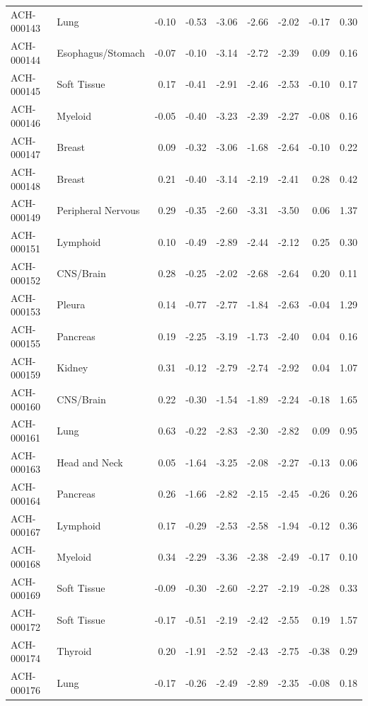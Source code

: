 \begin{footnotesize}
\begin{longtable}{llrrrrrrr}
ACH-000143 & Lung & -0.10 & -0.53 & -3.06 & -2.66 & -2.02 & -0.17 & 0.30 \\
ACH-000144 & Esophagus/Stomach & -0.07 & -0.10 & -3.14 & -2.72 & -2.39 & 0.09 & 0.16 \\
ACH-000145 & Soft Tissue & 0.17 & -0.41 & -2.91 & -2.46 & -2.53 & -0.10 & 0.17 \\
ACH-000146 & Myeloid & -0.05 & -0.40 & -3.23 & -2.39 & -2.27 & -0.08 & 0.16 \\
ACH-000147 & Breast & 0.09 & -0.32 & -3.06 & -1.68 & -2.64 & -0.10 & 0.22 \\
ACH-000148 & Breast & 0.21 & -0.40 & -3.14 & -2.19 & -2.41 & 0.28 & 0.42 \\
ACH-000149 & Peripheral Nervous & 0.29 & -0.35 & -2.60 & -3.31 & -3.50 & 0.06 & 1.37 \\
ACH-000151 & Lymphoid & 0.10 & -0.49 & -2.89 & -2.44 & -2.12 & 0.25 & 0.30 \\
ACH-000152 & CNS/Brain & 0.28 & -0.25 & -2.02 & -2.68 & -2.64 & 0.20 & 0.11 \\
ACH-000153 & Pleura & 0.14 & -0.77 & -2.77 & -1.84 & -2.63 & -0.04 & 1.29 \\
ACH-000155 & Pancreas & 0.19 & -2.25 & -3.19 & -1.73 & -2.40 & 0.04 & 0.16 \\
ACH-000159 & Kidney & 0.31 & -0.12 & -2.79 & -2.74 & -2.92 & 0.04 & 1.07 \\
ACH-000160 & CNS/Brain & 0.22 & -0.30 & -1.54 & -1.89 & -2.24 & -0.18 & 1.65 \\
ACH-000161 & Lung & 0.63 & -0.22 & -2.83 & -2.30 & -2.82 & 0.09 & 0.95 \\
ACH-000163 & Head and Neck & 0.05 & -1.64 & -3.25 & -2.08 & -2.27 & -0.13 & 0.06 \\
ACH-000164 & Pancreas & 0.26 & -1.66 & -2.82 & -2.15 & -2.45 & -0.26 & 0.26 \\
ACH-000167 & Lymphoid & 0.17 & -0.29 & -2.53 & -2.58 & -1.94 & -0.12 & 0.36 \\
ACH-000168 & Myeloid & 0.34 & -2.29 & -3.36 & -2.38 & -2.49 & -0.17 & 0.10 \\
ACH-000169 & Soft Tissue & -0.09 & -0.30 & -2.60 & -2.27 & -2.19 & -0.28 & 0.33 \\
ACH-000172 & Soft Tissue & -0.17 & -0.51 & -2.19 & -2.42 & -2.55 & 0.19 & 1.57 \\
ACH-000174 & Thyroid & 0.20 & -1.91 & -2.52 & -2.43 & -2.75 & -0.38 & 0.29 \\
ACH-000176 & Lung & -0.17 & -0.26 & -2.49 & -2.89 & -2.35 & -0.08 & 0.18 \\

\end{longtable}
\end{footnotesize}
